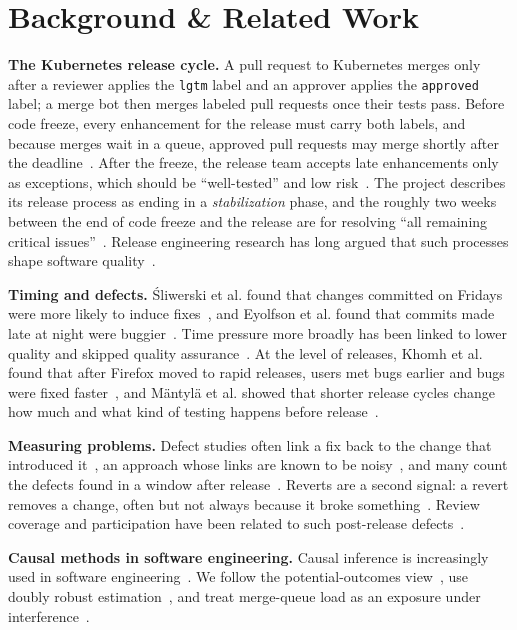 \documentclass[10pt,conference]{IEEEtran}
\begin{document}
\section{Background \& Related Work}

\textbf{The Kubernetes release cycle.} A pull request to Kubernetes merges only after a reviewer applies the \texttt{lgtm} label and an approver applies the \texttt{approved} label; a merge bot then merges labeled pull requests once their tests pass. Before code freeze, every enhancement for the release must carry both labels, and because merges wait in a queue, approved pull requests may merge shortly after the deadline~\cite{k8sphases}. After the freeze, the release team accepts late enhancements only as exceptions, which should be ``well-tested'' and low risk~\cite{k8sphases}. The project describes its release process as ending in a \emph{stabilization} phase, and the roughly two weeks between the end of code freeze and the release are for resolving ``all remaining critical issues''~\cite{k8scycle}. Release engineering research has long argued that such processes shape software quality~\cite{adams2016release}.

\textbf{Timing and defects.} Śliwerski et al. found that changes committed on Fridays were more likely to induce fixes~\cite{sliwerski2005fridays}, and Eyolfson et al. found that commits made late at night were buggier~\cite{eyolfson2011time}. Time pressure more broadly has been linked to lower quality and skipped quality assurance~\cite{kuutila2020time}. At the level of releases, Khomh et al. found that after Firefox moved to rapid releases, users met bugs earlier and bugs were fixed faster~\cite{khomh2012faster}, and Mäntylä et al. showed that shorter release cycles change how much and what kind of testing happens before release~\cite{mantyla2015rapid}.

\textbf{Measuring problems.} Defect studies often link a fix back to the change that introduced it~\cite{sliwerski2005changes}, an approach whose links are known to be noisy~\cite{dacosta2017framework,rosa2021szz}, and many count the defects found in a window after release~\cite{zimmermann2007predicting}. Reverts are a second signal: a revert removes a change, often but not always because it broke something~\cite{shimagaki2016reverted}. Review coverage and participation have been related to such post-release defects~\cite{mcintosh2014review}.

\textbf{Causal methods in software engineering.} Causal inference is increasingly used in software engineering~\cite{siebert2023causal}. We follow the potential-outcomes view~\cite{hernan2020causal}, use doubly robust estimation~\cite{bang2005doubly}, and treat merge-queue load as an exposure under interference~\cite{aronow2017interference}.
\end{document}
